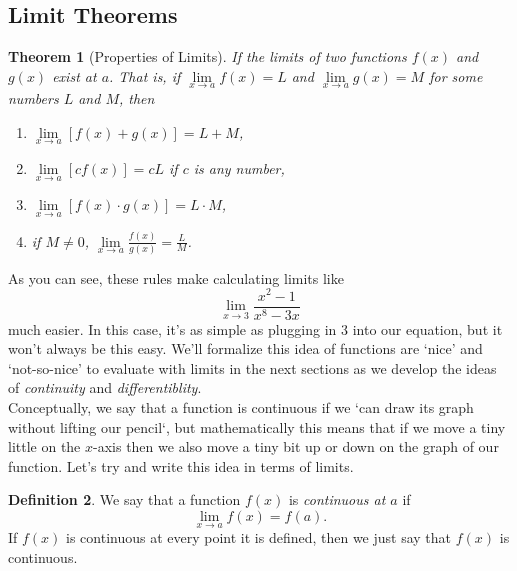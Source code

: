 \documentclass[12pt]{article}
\newtheorem{thm}{Theorem}[section]
\theoremstyle{definition}
\newtheorem{defn}[thm]{Definition}
\theoremstyle{plain}
\numberwithin{equation}{section}
\begin{document}
\subsection{Limit Theorems}

\begin{thm}[Properties of Limits]\label{LimRules}
If the limits of two functions $f(x)$ and $g(x)$ exist at $a$. That is, if $\lim\limits_{x\to a}f(x)=L$ and $\lim\limits_{x\to a}g(x)=M$ for some numbers $L$ and $M$, then
	\begin{enumerate}
		\item $\lim\limits_{x\to a}\left[f(x)+g(x)\right]=L+M$,
		\item $\lim\limits_{x\to a}\left[cf(x)\right]=cL$ if $c$ is any number,
		\item  $\lim\limits_{x\to a}\left[f(x)\cdot g(x)\right]=L\cdot M$,
		\item if $M\neq 0$, $\lim\limits_{x\to a}\frac{f(x)}{g(x)}=\frac{L}{M}$.
		\end{enumerate}
\end{thm}

As you can see, these rules make calculating limits like
\begin{equation}
\lim\limits_{x\to 3}\frac{x^2-1}{x^8-3x}
\end{equation}
much easier. In this case, it's as simple as plugging in 3 into our equation, but it won't always be this easy. We'll formalize this idea of functions are `nice' and  `not-so-nice' to evaluate with limits in the next sections as we develop the ideas of \textit{continuity} and \textit{differentiblity}.\\


Conceptually, we say that a function is continuous if we `can draw its graph without lifting our pencil`, but mathematically this means that if we move a tiny little on the $x$-axis then we also move a tiny bit up or down on the graph of our function. Let's try and write this idea in terms of limits.

\begin{defn}
We say that a function $f(x)$ is \emph{continuous at $a$} if \begin{equation}
	\lim\limits_{x\to a}f(x)=f(a).
\end{equation}
If $f(x)$ is continuous at every point it is defined, then we just say that $f(x)$ is continuous.
\end{defn}
\end{document}
